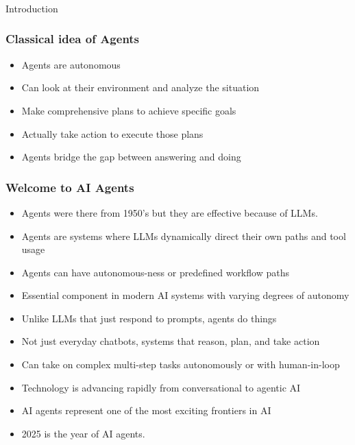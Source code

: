 \begin{frame}[fragile]\frametitle{}
\begin{center}
{\Large Introduction}
\end{center}
\end{frame}

\begin{frame}[fragile]\frametitle{Classical idea of Agents}
      \begin{itemize}
        \item Agents are autonomous
        \item Can look at their environment and analyze the situation
        \item Make comprehensive plans to achieve specific goals
        \item Actually take action to execute those plans
        \item Agents bridge the gap between answering and doing
      \end{itemize}
\end{frame}

\begin{frame}[fragile]\frametitle{Welcome to AI Agents}
      \begin{itemize}
		\item Agents were there from 1950's but they are effective because of LLMs.
        \item Agents are systems where LLMs dynamically direct their own paths and tool usage
        \item Agents can have autonomous-ness or predefined workflow paths
        \item Essential component in modern AI systems with varying degrees of autonomy	  
		\item Unlike LLMs that just respond to prompts, agents do things
        \item Not just everyday chatbots, systems that reason, plan, and take action
        \item Can take on complex multi-step tasks autonomously or with human-in-loop
        \item Technology is advancing rapidly from conversational to agentic AI
        \item AI agents represent one of the most exciting frontiers in AI
		\item 2025 is the year of AI agents.
      \end{itemize}
\end{frame}


